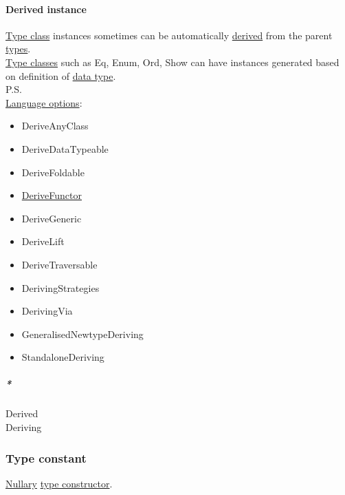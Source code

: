 \documentclass[11pt]{article}
\begin{document}
\paragraph{\label{org66b4250}Derived instance}
\label{sec:org5437532}
\hyperref[orga4a5066]{Type class} instances sometimes can be automatically \hyperref[org0c133f8]{derived} from the parent \hyperref[org3927fd9]{types}.\\

\hyperref[org2efac60]{Type classes} such as Eq, Enum, Ord, Show can have instances generated based on definition of \hyperref[org965cde3]{data type}.\\

P.S.\\

\hyperref[orgc60240b]{Language options}:\\
\begin{itemize}
\item DeriveAnyClass\\
\item DeriveDataTypeable\\
\item DeriveFoldable\\
\item \hyperref[org46d145a]{DeriveFunctor}\\
\item DeriveGeneric\\
\item DeriveLift\\
\item DeriveTraversable\\
\item DerivingStrategies\\
\item DerivingVia\\
\item GeneralisedNewtypeDeriving\\
\item StandaloneDeriving\\
\end{itemize}

\subparagraph{\emph{*}}
\label{sec:org8d06743}

\label{org0c133f8}Derived\\
\label{orgdecadd4}Deriving\\

\subsubsection{\label{org355d800}Type constant}
\label{sec:org5d5590d}
\hyperref[org0fa472a]{Nullary} \hyperref[org7285f45]{type constructor}.\\
\end{document}
